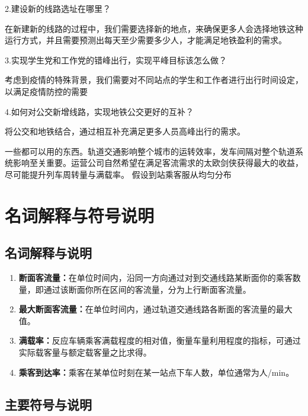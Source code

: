 \documentclass[12pt,a4paper]{mcmthesis}
\newcommand\wordc[1]{\textbf{#1}}
\begin{document}
  
  {2.建设新的线路选址在哪里？}
  
  {在新建新的线路的过程中，我们需要选择新的地点，来确保更多人会选择地铁这种运行方式，并且需要预测出每天至少需要多少人，才能满足地铁盈利的需求。}
 
  {3.实现学生党和工作党的错峰出行，实现平峰目标该怎么做？}
  
   {考虑到疫情的特殊背景，我们需要对不同站点的学生和工作者进行出行时间设定，以满足疫情防控的需要}
  
  {4.如何对公交新增线路，实现地铁公交更好的互补？}
  
   {将公交和地铁结合，通过相互补充满足更多人员高峰出行的需求。}
  
  {一些都可以用的东西。轨道交通影响整个城市的运转效率，发车间隔对整个轨道系统影响至关重要。运营公司自然希望在满足客流需求的太欧剑侠获得最大的收益，尽可能提升列车周转量与满载率。}
  {假设到站乘客服从均匀分布}



\section{名词解释与符号说明}

\subsection{名词解释与说明}
\begin{enumerate}
	\item \wordc{断面客流量：}在单位时间内，沿同一方向通过对到交通线路某断面你的乘客数量，即通过该断面你所在区间的客流量，分为上行断面客流量。
	
	\item \wordc{最大断面客流量：}在单位时间内，通过轨道交通线路各断面的客流量的最大值。
	
	\item \wordc{满载率：}反应车辆乘客满载程度的相对值，衡量车量利用程度的指标，可通过实际载客量与额定载客量之比求得。
	
	\item \wordc{乘客到达率：}乘客在某单位时刻在某一站点下车人数，单位通常为人/min。
	

	
	
\end{enumerate}
\subsection{主要符号与说明}
\end{document}
